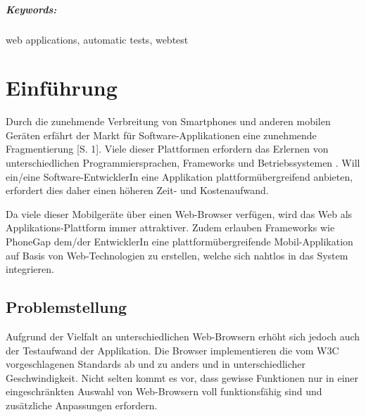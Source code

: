 \documentclass[a4paper,bibtotoc,oneside]{scrbook}
\begin{document}
\vfill
\paragraph*{Keywords:} web applications, automatic tests, webtest
\newpage


\tableofcontents\thispagestyle{empty}
\newpage

\setcounter{page}{1}

\chapter{Einführung}

Durch die zunehmende Verbreitung von Smartphones und anderen mobilen Geräten erfährt der Markt für Software-Applikationen eine zunehmende Fragmentierung \cite{smartphone}[S. 1]. Viele dieser Plattformen erfordern das Erlernen von unterschiedlichen Programmiersprachen, Frameworks und Betriebssystemen \cite{android}\cite{ios}. Will ein/eine Software-EntwicklerIn eine Applikation plattformübergreifend anbieten, erfordert dies daher einen höheren Zeit- und Kostenaufwand.

Da viele dieser Mobilgeräte über einen Web-Browser verfügen, wird das Web als Applikations-Plattform immer attraktiver. Zudem erlauben Frameworks wie PhoneGap \cite{phonegap} dem/der EntwicklerIn eine plattformübergreifende Mobil-Applikation auf Basis von Web-Technologien zu erstellen, welche sich nahtlos in das System integrieren. 

\section{Problemstellung}
Aufgrund der Vielfalt an unterschiedlichen Web-Browsern erhöht sich jedoch auch der Testaufwand der Applikation. Die Browser implementieren die vom W3C vorgeschlagenen Standards ab und zu anders und in unterschiedlicher Geschwindigkeit. Nicht selten kommt es vor, dass gewisse Funktionen nur in einer eingeschränkten Auswahl von Web-Browsern voll funktionsfähig sind und zusätzliche Anpassungen erfordern. \cite{caniuse}
\end{document}
